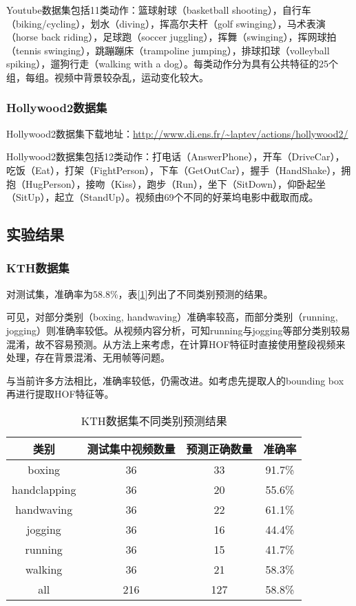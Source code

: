 \documentclass[a4paper, 12pt, UTF8]{article}
\begin{document}
Youtube数据集包括11类动作：篮球射球（basketball shooting），自行车（biking/cycling），划水（diving），挥高尔夫杆（golf swinging），马术表演（horse back riding），足球跑（soccer juggling），挥舞（swinging），挥网球拍（tennis swinging），跳蹦蹦床（trampoline jumping），排球扣球（volleyball spiking），遛狗行走（walking with a dog）。每类动作分为具有公共特征的25个组，每组。视频中背景较杂乱，运动变化较大。

\subsubsection{Hollywood2数据集}

Hollywood2数据集下载地址：\url{http://www.di.ens.fr/~laptev/actions/hollywood2/}

Hollywood2数据集包括12类动作：打电话（AnswerPhone），开车（DriveCar），吃饭（Eat），打架（FightPerson），下车（GetOutCar），握手（HandShake），拥抱（HugPerson），接吻（Kiss），跑步（Run），坐下（SitDown），仰卧起坐（SitUp），起立（StandUp）。视频由69个不同的好莱坞电影中截取而成。

\subsection{实验结果}

\subsubsection{KTH数据集}

对测试集，准确率为$58.8\%$，表[\ref{table_kth}]列出了不同类别预测的结果。

可见，对部分类别（boxing, handwaving）准确率较高，而部分类别（running, jogging）则准确率较低。从视频内容分析，可知running与jogging等部分类别较易混淆，故不容易预测。从方法上来考虑，在计算HOF特征时直接使用整段视频来处理，存在背景混淆、无用帧等问题。

与当前许多方法相比，准确率较低，仍需改进。如考虑先提取人的bounding box再进行提取HOF特征等。

\begin{table}[h!]
    \centering
    \caption{KTH数据集不同类别预测结果}
    \label{table_kth}
    \begin{tabular}{cccc}
        类别 & 测试集中视频数量 & 预测正确数量 & 准确率 \\ \hline
        boxing       & 36  & 33  & 91.7\% \\
        handclapping & 36  & 20  & 55.6\% \\
        handwaving   & 36  & 22  & 61.1\% \\
        jogging      & 36  & 16  & 44.4\% \\
        running      & 36  & 15  & 41.7\% \\
        walking      & 36  & 21  & 58.3\% \\
        all          & 216 & 127 & 58.8\%
    \end{tabular}
\end{table}
 
\end{document}
